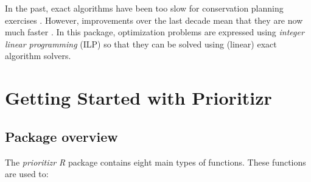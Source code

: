 \documentclass[
  12pt,
]{book}
\begin{document}
In the past, exact algorithms have been too slow for conservation planning exercises \citep{r9}. However, improvements over the last decade mean that they are now much faster \citep{r23, r1}. In this package, optimization problems are expressed using \emph{integer linear programming} (ILP) so that they can be solved using (linear) exact algorithm solvers.

\hypertarget{getting-started-with-prioritizr}{%
\chapter{Getting Started with Prioritizr}\label{getting-started-with-prioritizr}}

\hypertarget{package-overview}{%
\section{Package overview}\label{package-overview}}

The \emph{prioritizr R} package contains eight main types of functions. These functions are used to:
\end{document}
